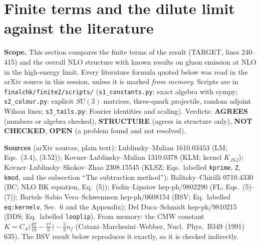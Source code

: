 \section{Finite terms and the dilute limit against the literature}
\noindent\textbf{Scope.} This section compares the finite terms of the result (TARGET, lines 240--415) and the overall NLO structure with known results on gluon emission at NLO in the high-energy limit. Every literature formula quoted below was read in the arXiv source in this session, unless it is marked \emph{from memory}. Scripts are in \texttt{finalchk/finite2/scripts/} (\texttt{s1\_constants.py}: exact algebra with sympy; \texttt{s2\_colour.py}: explicit $SU(3)$ matrices, three-quark projectile, random adjoint Wilson lines; \texttt{s3\_tails.py}: Fourier identities and scaling). Verdicts: \textbf{AGREES} (numbers or algebra checked), \textbf{STRUCTURE} (agrees in structure only), \textbf{NOT CHECKED}, \textbf{OPEN} (a problem found and not resolved).

\medskip
\noindent\textbf{Sources} (arXiv sources, plain text): Lublinsky--Mulian 1610.03453 (LM; Eqs.~(3.4), (3.52)); Kovner--Lublinsky--Mulian 1310.0378 (KLM; kernel $K_{JSJ}$); Kovner--Lublinsky--Skokov--Zhao 2308.15545 (KLSZ; Eqs.~labelled \texttt{kprime}, \texttt{Z}, \texttt{kmod}, and the subsection ``The subtraction method''); Balitsky--Chirilli 0710.4330 (BC; NLO BK equation, Eq.~(5)); Fadin--Lipatov hep-ph/9802290 (FL; Eqs.~(5)--(7)); Bartels--Sabio Vera--Schwennsen hep-ph/0608154 (BSV; Eq.~labelled \texttt{eq:kernelv}, Sec.~6 and the Appendix); Del Duca--Schmidt hep-ph/9810215 (DDS; Eq.~labelled \texttt{looplip}). From memory: the CMW constant $K=C_{A}\big(\frac{67}{18}-\frac{\pi^{2}}{6}\big)-\frac{5}{9}n_{f}$ (Catani--Marchesini--Webber, Nucl.\ Phys.\ B349 (1991) 635). The BSV result below reproduces it exactly, so it is checked indirectly.

